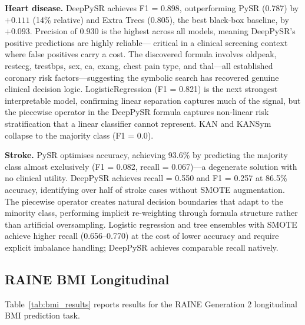 \documentclass[10pt,twocolumn]{article}
\begin{document}
\textbf{Heart disease.}  DeepPySR achieves F1 = 0.898, outperforming PySR
(0.787) by $+0.111$ (14\% relative) and Extra Trees (0.805), the best
black-box baseline, by $+0.093$.  Precision of 0.930 is the highest across
all models, meaning DeepPySR's positive predictions are highly reliable—
critical in a clinical screening context where false positives carry a cost.
The discovered formula involves oldpeak, restecg, trestbps, sex, ca, exang,
chest pain type, and thal—all established coronary risk factors—suggesting the
symbolic search has recovered genuine clinical decision logic.  LogisticRegression
(F1 = 0.821) is the next strongest interpretable model, confirming linear
separation captures much of the signal, but the piecewise operator in the
DeepPySR formula captures non-linear risk stratification that a linear
classifier cannot represent.  KAN and KANSym collapse to the majority class
(F1 = 0.0).

\textbf{Stroke.}  PySR optimises accuracy, achieving 93.6\% by predicting the
majority class almost exclusively (F1 = 0.082, recall = 0.067)—a degenerate
solution with no clinical utility.  DeepPySR achieves recall = 0.550 and
F1 = 0.257 at 86.5\% accuracy, identifying over half of stroke cases without
SMOTE augmentation.  The piecewise operator creates natural decision boundaries
that adapt to the minority class, performing implicit re-weighting through
formula structure rather than artificial oversampling.  Logistic regression and
tree ensembles with SMOTE achieve higher recall (0.656–0.770) at the cost of
lower accuracy and require explicit imbalance handling; DeepPySR achieves
comparable recall natively.

\subsection{RAINE BMI Longitudinal}

Table~\ref{tab:bmi_results} reports results for the RAINE Generation 2
longitudinal BMI prediction task.
\end{document}
